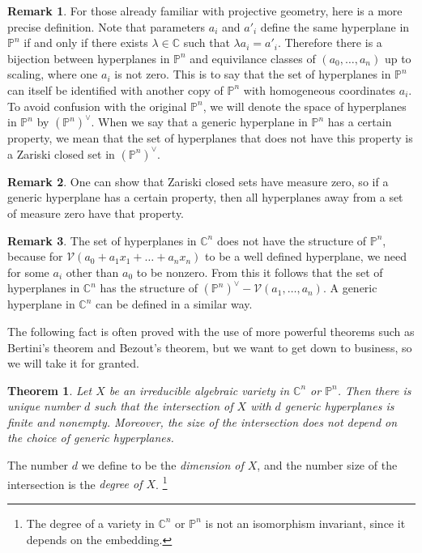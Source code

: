 \documentclass[12pt]{article}
\newtheorem{theorem}{Theorem}[section]
\theoremstyle{definition}
\newtheorem{remark}{Remark}[section]
\newcommand{\C}{\mathbb{C}}
\newcommand{\PP}{\mathbb{P}}
\begin{document}
\begin{remark}
For those already familiar with projective geometry, 
here is a more precise definition. Note that 
parameters $a_i$ and $a'_i$ define the same hyperplane in $\PP^n$ if and 
only if there exists $\lambda \in \C$ such that $\lambda a_i = a'_i$. Therefore 
there is a bijection between hyperplanes in $\PP^n$ and equivilance 
classes of $(a_0, \ldots, a_n)$ up to scaling, where one $a_i$ is not 
zero. This is to say that the set of hyperplanes in $\PP^n$ can itself be 
identified with another copy of $\PP^n$ with homogeneous coordinates 
$a_i$. To avoid confusion with the original $\PP^n$, we will denote the 
space of hyperplanes in $\PP^n$ by $(\PP^n)^\vee$. When we say that a 
generic hyperplane in $\PP^n$ has a certain property, we mean that the 
set of hyperplanes that does not have this property is a Zariski closed 
set in $(\PP^n)^\vee$.
\end{remark}

\begin{remark}
   One can show that Zariski closed sets have measure zero, so if a 
   generic hyperplane has a certain property, then all hyperplanes away 
   from a set of measure zero have that property.
\end{remark}
\begin{remark}
   The set of hyperplanes in $\C^n$ does not have the structure of 
   $\PP^n$, because for $\mathcal{V}(a_0 + a_1x_1 + \ldots + a_nx_n)$ to 
   be a well defined hyperplane, we need for some $a_i$ other than $a_0$ 
   to be nonzero. From this it follows that the set of hyperplanes in 
   $\C^n$ has the structure of $(\PP^n)^\vee - \mathcal{V}(a_1, \ldots, 
   a_n)$. A generic hyperplane in $\C^n$ can be defined in a similar 
   way.
\end{remark}

The following fact is often proved with the use of more powerful 
theorems such as Bertini's theorem and Bezout's theorem, but we want to 
get down to business, so we will take it for granted.

\begin{theorem}
   Let $X$ be an irreducible algebraic variety in $\C^n$ or $\PP^n$. 
   Then there is unique number $d$ such that the intersection of $X$ 
   with $d$ generic hyperplanes is finite and nonempty. Moreover, the 
   size of the intersection does not depend on the choice of generic 
   hyperplanes.
\end{theorem}

The number $d$ we define to be the \emph{dimension of $X$}, and the number size 
of the intersection is the \emph{degree of $X$}. \footnote{The degree of 
a variety in $\C^n$ or $\PP^n$ is not an isomorphism invariant, since it 
depends on the embedding.}
\end{document}
